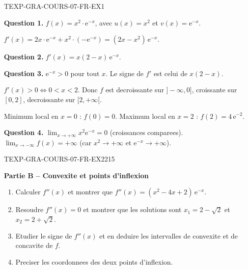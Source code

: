 \begin{corrige}{TEXP-GRA-COURS-07-FR-EX1}

\textbf{Question 1.} $f(x) = x^2 \cdot \mathrm{e}^{-x}$, avec $u(x) = x^2$ et $v(x) = \mathrm{e}^{-x}$.

$f'(x) = 2x \cdot \mathrm{e}^{-x} + x^2 \cdot (-\mathrm{e}^{-x}) = (2x - x^2)\,\mathrm{e}^{-x}$.

\textbf{Question 2.} $f'(x) = x(2-x)\,\mathrm{e}^{-x}$.

\textbf{Question 3.} $\mathrm{e}^{-x} > 0$ pour tout $x$. Le signe de $f'$ est celui de $x(2-x)$.

$f'(x) > 0 \iff 0 < x < 2$. Donc $f$ est decroissante sur $]-\infty, 0]$, croissante sur $[0, 2]$, decroissante sur $[2, +\infty[$.

Minimum local en $x = 0$ : $f(0) = 0$. Maximum local en $x = 2$ : $f(2) = 4\,\mathrm{e}^{-2}$.

\textbf{Question 4.} $\lim_{x \to +\infty} x^2 \mathrm{e}^{-x} = 0$ (croissances comparees). $\lim_{x \to -\infty} f(x) = +\infty$ (car $x^2 \to +\infty$ et $\mathrm{e}^{-x} \to +\infty$).

\end{corrige}

\bigskip


\begin{exercice}{TEXP-GRA-COURS-07-FR-EX2}{2}{15}

\textbf{Partie B -- Convexite et points d'inflexion}

\begin{enumerate}
  \item Calculer $f''(x)$ et montrer que $f''(x) = (x^2 - 4x + 2)\,\mathrm{e}^{-x}$.
  \item Resoudre $f''(x) = 0$ et montrer que les solutions sont $x_1 = 2 - \sqrt{2}$ et $x_2 = 2 + \sqrt{2}$.
  \item Etudier le signe de $f''(x)$ et en deduire les intervalles de convexite et de concavite de $f$.
  \item Preciser les coordonnees des deux points d'inflexion.
\end{enumerate}

\end{exercice}

